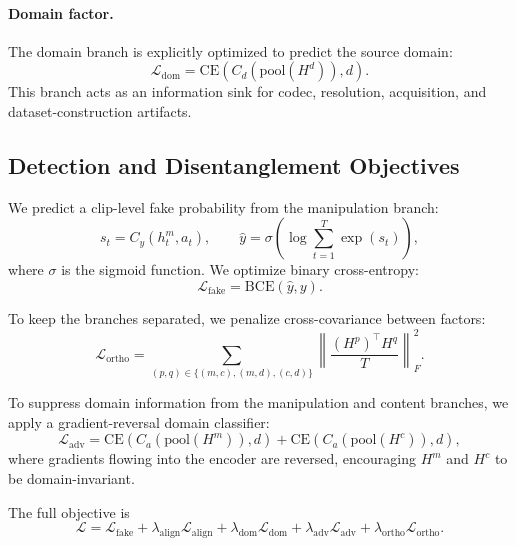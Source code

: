 \documentclass{article}
\begin{document}
\paragraph{Domain factor.}
The domain branch is explicitly optimized to predict the source domain:
\begin{equation}
\mathcal{L}_{\mathrm{dom}} = \mathrm{CE}(C_d(\mathrm{pool}(H^d)), d).
\end{equation}
This branch acts as an information sink for codec, resolution, acquisition, and dataset-construction artifacts.

\subsection{Detection and Disentanglement Objectives}

We predict a clip-level fake probability from the manipulation branch:
\begin{equation}
s_t = C_y(h_t^m, a_t), \qquad
\hat{y} = \sigma \left(\log \sum_{t=1}^T \exp(s_t)\right),
\end{equation}
where $\sigma$ is the sigmoid function. We optimize binary cross-entropy:
\begin{equation}
\mathcal{L}_{\mathrm{fake}} = \mathrm{BCE}(\hat{y}, y).
\end{equation}

To keep the branches separated, we penalize cross-covariance between factors:
\begin{equation}
\mathcal{L}_{\mathrm{ortho}} =
\sum_{(p,q) \in \{(m,c),(m,d),(c,d)\}}
\left\|
\frac{(H^p)^\top H^q}{T}
\right\|_F^2.
\end{equation}

To suppress domain information from the manipulation and content branches, we apply a gradient-reversal domain classifier:
\begin{equation}
\mathcal{L}_{\mathrm{adv}} =
\mathrm{CE}(C_a(\mathrm{pool}(H^m)), d)
+
\mathrm{CE}(C_a(\mathrm{pool}(H^c)), d),
\end{equation}
where gradients flowing into the encoder are reversed, encouraging $H^m$ and $H^c$ to be domain-invariant.

The full objective is
\begin{equation}
\mathcal{L}
=
\mathcal{L}_{\mathrm{fake}}
+
\lambda_{\mathrm{align}} \mathcal{L}_{\mathrm{align}}
+
\lambda_{\mathrm{dom}} \mathcal{L}_{\mathrm{dom}}
+
\lambda_{\mathrm{adv}} \mathcal{L}_{\mathrm{adv}}
+
\lambda_{\mathrm{ortho}} \mathcal{L}_{\mathrm{ortho}}.
\end{equation}
\end{document}
